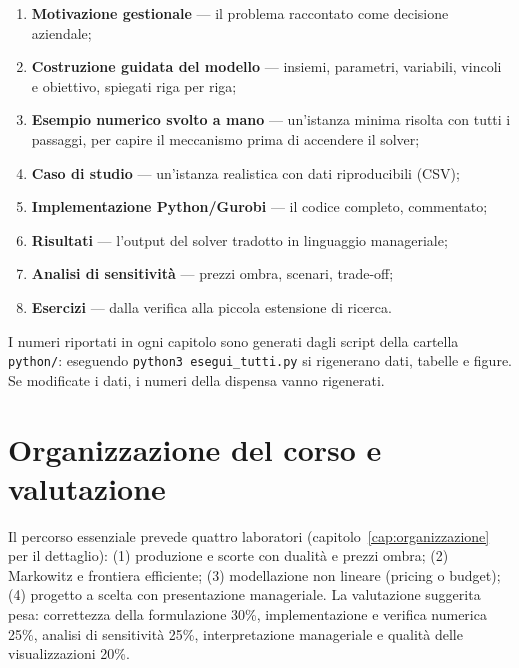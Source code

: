 \begin{enumerate}
  \item \textbf{Motivazione gestionale} --- il problema raccontato come decisione aziendale;
  \item \textbf{Costruzione guidata del modello} --- insiemi, parametri, variabili, vincoli
        e obiettivo, spiegati riga per riga;
  \item \textbf{Esempio numerico svolto a mano} --- un'istanza minima risolta con tutti i
        passaggi, per capire il meccanismo prima di accendere il solver;
  \item \textbf{Caso di studio} --- un'istanza realistica con dati riproducibili (CSV);
  \item \textbf{Implementazione Python/Gurobi} --- il codice completo, commentato;
  \item \textbf{Risultati} --- l'output del solver tradotto in linguaggio manageriale;
  \item \textbf{Analisi di sensitività} --- prezzi ombra, scenari, trade-off;
  \item \textbf{Esercizi} --- dalla verifica alla piccola estensione di ricerca.
\end{enumerate}

\begin{attenzione}
I numeri riportati in ogni capitolo sono generati dagli script della cartella
\texttt{python/}: eseguendo \texttt{python3 esegui\_tutti.py} si rigenerano dati,
tabelle e figure. Se modificate i dati, i numeri della dispensa vanno rigenerati.
\end{attenzione}

\section{Organizzazione del corso e valutazione}

Il percorso essenziale prevede quattro laboratori (capitolo~\ref{cap:organizzazione}
per il dettaglio): (1) produzione e scorte con dualità e prezzi ombra; (2) Markowitz e
frontiera efficiente; (3) modellazione non lineare (pricing o budget); (4) progetto a
scelta con presentazione manageriale. La valutazione suggerita pesa: correttezza della
formulazione 30\%, implementazione e verifica numerica 25\%, analisi di sensitività
25\%, interpretazione manageriale e qualità delle visualizzazioni 20\%.
